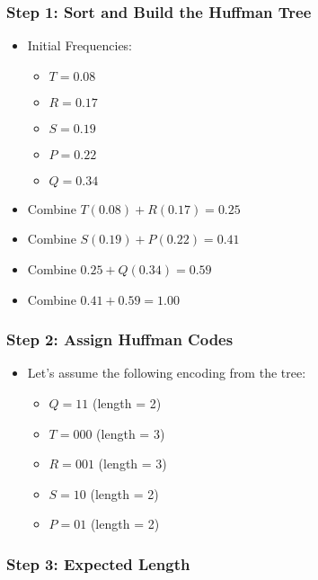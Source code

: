 \documentclass[14pt]{extarticle}
\begin{document}
\subsubsection*{Step 1: Sort and Build the Huffman Tree}

\begin{itemize}
    \item Initial Frequencies:
    \begin{itemize}
        \item $T = 0.08$
        \item $R = 0.17$
        \item $S = 0.19$
        \item $P = 0.22$
        \item $Q = 0.34$
    \end{itemize}

    \item Combine $T(0.08) + R(0.17) = 0.25$

    \item Combine $S(0.19) + P(0.22) = 0.41$

    \item Combine $0.25 + Q(0.34) = 0.59$

    \item Combine $0.41 + 0.59 = 1.00$
\end{itemize}

\subsubsection*{Step 2: Assign Huffman Codes}

\begin{itemize}
    \item Let’s assume the following encoding from the tree:
    \begin{itemize}
        \item $Q = 11$ (length = 2)
        \item $T = 000$ (length = 3)
        \item $R = 001$ (length = 3)
        \item $S = 10$ (length = 2)
        \item $P = 01$ (length = 2)
    \end{itemize}
\end{itemize}

\subsubsection*{Step 3: Expected Length}
\end{document}
